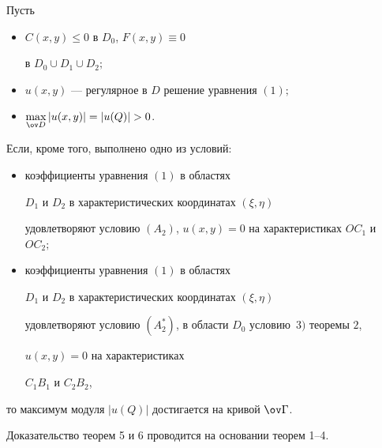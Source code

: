 \begin{thm}


Пусть


\begin{itemize}


\item[1)] $C(x,y)\le 0$ в $D_0$, $F(x,y)\equiv 0$


в $D_0\cup D_1\cup D_2;$


\item[2)] $u(x,y)$ --- регулярное в $D$ решение уравнения $(1);$


\item[3)] $\max \limits_{\ov D} |u(x,y)|=|u(Q)|>0$.


\end{itemize}


Если, кроме того, выполнено одно из условий${:}$


\begin{itemize}


\begin{itemize}


\item[a)] коэффициенты уравнения $(1)$ в областях


$D_1$ и $D_2$ в характеристических координатах $(\xi,\eta)$


удовлетворяют условию $(A_2)$, $u(x,y)=0$ на характеристиках $OC_1$ и $OC_2;$


\item[б)] коэффициенты уравнения $(1)$ в областях


$D_1$ и $D_2$ в характеристических координатах $(\xi,\eta)$


удовлетворяют условию $(A_2^*)$, в области $D_0$ условию~$3)$ теоремы $2$,


$u(x,y)=0$ на характеристиках


$C_1B_1$ и $C_2B_2$,


\end{itemize}


\end{itemize}


то максимум модуля $|u(Q)|$ достигается на кривой $\ov \Gamma$.


\end{thm}





Доказательство теорем 5 и 6 проводится на основании теорем 1--4.





